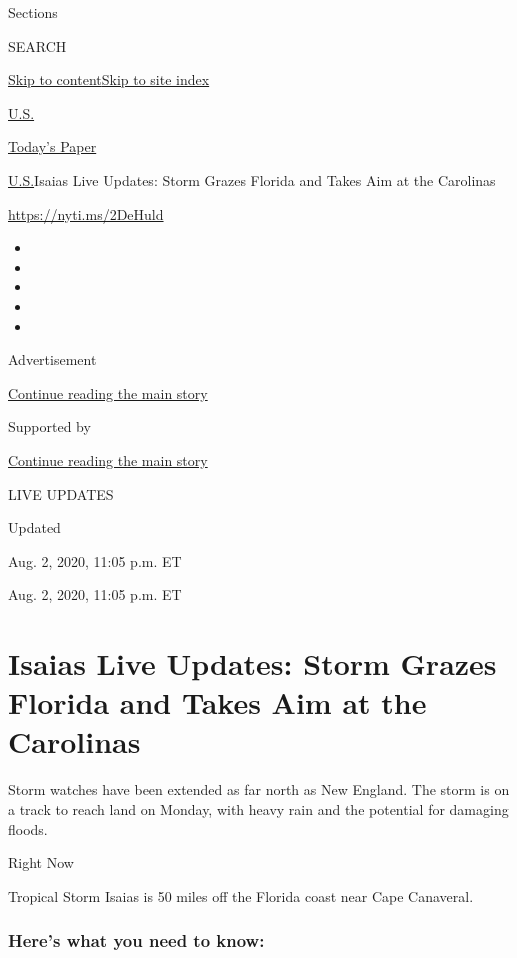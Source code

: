 Sections

SEARCH

\protect\hyperlink{site-content}{Skip to
content}\protect\hyperlink{site-index}{Skip to site index}

\href{https://www.nytimes.com/section/us}{U.S.}

\href{https://myaccount.nytimes.com/auth/login?response_type=cookie\&client_id=vi}{}

\href{https://www.nytimes.com/section/todayspaper}{Today's Paper}

\href{/section/us}{U.S.}\textbar{}Isaias Live Updates: Storm Grazes
Florida and Takes Aim at the Carolinas

\url{https://nyti.ms/2DeHuld}

\begin{itemize}
\item
\item
\item
\item
\item
\end{itemize}

Advertisement

\protect\hyperlink{after-top}{Continue reading the main story}

Supported by

\protect\hyperlink{after-sponsor}{Continue reading the main story}

LIVE UPDATES

Updated~

Aug. 2, 2020, 11:05 p.m. ET

Aug. 2, 2020, 11:05 p.m. ET

\hypertarget{isaias-live-updates-storm-grazes-florida-and-takes-aim-at-the-carolinas}{%
\section{Isaias Live Updates: Storm Grazes Florida and Takes Aim at the
Carolinas}\label{isaias-live-updates-storm-grazes-florida-and-takes-aim-at-the-carolinas}}

Storm watches have been extended as far north as New England. The storm
is on a track to reach land on Monday, with heavy rain and the potential
for damaging floods.

Right Now

Tropical Storm Isaias is 50 miles off the Florida coast near Cape
Canaveral.

\hypertarget{heres-what-you-need-to-know}{%
\subsubsection{Here's what you need to
know:}\label{heres-what-you-need-to-know}}

